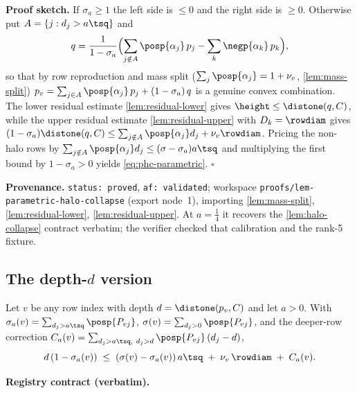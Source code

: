 \noindent\textbf{Proof sketch.} If $\sigma_a\ge1$ the left side is $\le0$ and the right side is
$\ge0$. Otherwise put $A=\{j:d_j>a\tsq\}$ and
\[
  q=\frac{1}{1-\sigma_a}\Bigl(\sum_{j\notin A}\posp{\alpha_j}\,p_j-\sum_k\negp{\alpha_k}\,p_k\Bigr),
\]
so that by row reproduction and mass split ($\sum_j\posp{\alpha_j}=1+\nu_v$, \ref{lem:mass-split})
$p_v=\sum_{j\in A}\posp{\alpha_j}\,p_j+(1-\sigma_a)\,q$ is a genuine convex combination. The lower
residual estimate \ref{lem:residual-lower} gives $\height\le\distone(q,C)$, while the upper residual
estimate \ref{lem:residual-upper} with $D_k=\rowdiam$ gives
$(1-\sigma_a)\distone(q,C)\le\sum_{j\notin A}\posp{\alpha_j}d_j+\nu_v\rowdiam$. Pricing the non-halo
rows by $\sum_{j\notin A}\posp{\alpha_j}d_j\le(\sigma-\sigma_a)a\tsq$ and multiplying the first bound by
$1-\sigma_a>0$ yields \eqref{eq:phc-parametric}. \hfill$\square$

\noindent\textbf{Provenance.} \texttt{status: proved}, \texttt{af: validated}; workspace
\texttt{proofs/lem-parametric-halo-collapse} (export node~1), importing \ref{lem:mass-split},
\ref{lem:residual-lower}, \ref{lem:residual-upper}. At $a=\tfrac14$ it recovers the
\ref{lem:halo-collapse} contract verbatim; the verifier checked that calibration and the rank-5
fixture.

\subsection{The depth-\texorpdfstring{$d$}{d} version}

\begin{lemma}\label{lem:depth-d-halo-collapse}
Let $v$ be any row index with depth $d=\distone(p_v,C)$ and let $a>0$. With
$\sigma_a(v)=\sum_{d_j>a\tsq}\posp{P_{vj}}$, $\sigma(v)=\sum_{d_j>0}\posp{P_{vj}}$, and the
deeper-row correction $C_a(v)=\sum_{d_j>a\tsq,\ d_j>d}\posp{P_{vj}}\,(d_j-d)$,
\begin{equation}\label{eq:phc-depthd}
  d\,(1-\sigma_a(v))\;\le\;(\sigma(v)-\sigma_a(v))\,a\tsq\;+\;\nu_v\,\rowdiam\;+\;C_a(v).
\end{equation}
\end{lemma}

\noindent\textbf{Registry contract (verbatim).}

